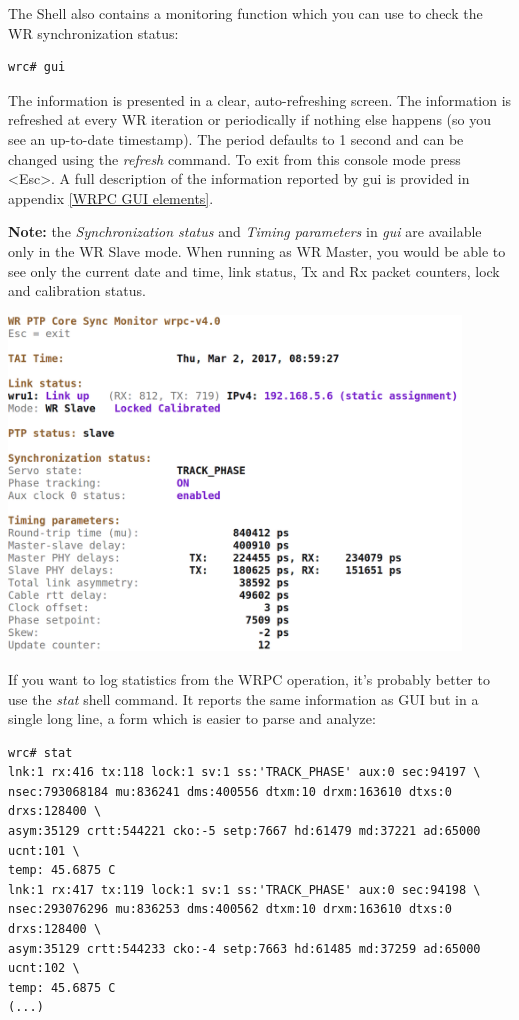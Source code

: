 \documentclass[a4paper, 12pt]{article}
\newcommand{\codeHook}[1]{\mbox{\ttfamily\MakeTextUppercase{#1}}}
\begin{document}
The Shell also contains a monitoring function which you can use to check the
\codeHook{wr} synchronization status:

\begin{lstlisting}
wrc# gui
\end{lstlisting}

The information is presented in a clear, auto-refreshing screen. The
information is refreshed at every WR iteration or periodically if
nothing else happens (so you see an up-to-date timestamp). The period
defaults to 1 second and can be changed using the \textit{refresh} command. To exit from
this console mode press <Esc>. A full description of the information reported
by gui is provided in appendix \ref{WRPC GUI elements}.

\noindent\textbf{Note:} the \textit{Synchronization status} and \textit{Timing parameters} in \textit{gui}
are available only in the \codeHook{wr} Slave mode. When running as \codeHook{wr} Master, you
would be able to see only the current date and time, link status, Tx and Rx
packet counters, lock and calibration status.

\vspace{1em}
\includegraphics[width=12cm]{wrpc_mon.png}
\vspace{1em}

If you want to log statistics from the \codeHook{wrpc} operation, it's probably
better to use the \textit{stat} shell command. It reports the same information as GUI
but in a single long line, a form which is easier to parse and analyze:

\begin{lstlisting}
wrc# stat
lnk:1 rx:416 tx:118 lock:1 sv:1 ss:'TRACK_PHASE' aux:0 sec:94197 \
nsec:793068184 mu:836241 dms:400556 dtxm:10 drxm:163610 dtxs:0 drxs:128400 \
asym:35129 crtt:544221 cko:-5 setp:7667 hd:61479 md:37221 ad:65000 ucnt:101 \
temp: 45.6875 C
lnk:1 rx:417 tx:119 lock:1 sv:1 ss:'TRACK_PHASE' aux:0 sec:94198 \
nsec:293076296 mu:836253 dms:400562 dtxm:10 drxm:163610 dtxs:0 drxs:128400 \
asym:35129 crtt:544233 cko:-4 setp:7663 hd:61485 md:37259 ad:65000 ucnt:102 \
temp: 45.6875 C
(...)
\end{lstlisting}
\end{document}
